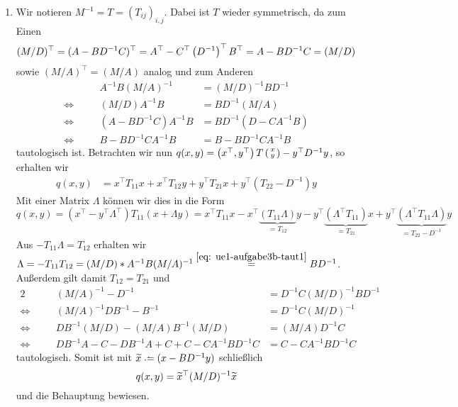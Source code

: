 \begin{exercisePage}
	\begin{enumerate}[label=(\alph*)]
		\item Wir notieren $M^{-1} = T = (T_{ij})_{i,j}$. Dabei ist $T$ wieder symmetrisch, da zum Einen
		\begin{equation*}
			(M/D)^\top
			= (A - BD^{-1}C)^\top 
			= A^\top - C^\top \left( D^{-1} \right)^{\top} B^\top
			= A - BD^{-1}C 
			= (M/D)
		\end{equation*}
		sowie $(M/A)^\top = (M/A)$ analog und zum Anderen
		\begin{equation}
			\begin{alignedat}{2}
				&& A^{-1} B(M/A)^{-1} &= (M/D)^{-1} BD^{-1} \\
				\Leftrightarrow &\quad& (M/D)A^{-1}B &= BD^{-1} (M/A) \\
				\Leftrightarrow &\quad& (A-BD^{-1}C)A^{-1}B  &= BD^{-1}(D-CA^{-1}B) \\
				\Leftrightarrow &\quad& B-BD^{-1}CA^{-1}B &= B-BD^{-1}CA^{-1}B 
			\end{alignedat}
			\tag{$\star$} \label{eq: ue1-aufgabe3b-taut1}
		\end{equation}
		tautologisch ist.
		Betrachten wir nun $q(x,y) = \left( x^\top, y^\top \right) T \left(\begin{smallmatrix} x \\ y \end{smallmatrix}\right) - y^\top D^{-1} y$, so erhalten wir
		\begin{align*}
			q(x,y) 
			&= x^\top T_{11} x + x^\top T_{12} y + y^\top T_{21} x + y^\top (T_{22} - D^{-1}) y
		\end{align*}
		Mit einer Matrix $\Lambda$ können wir dies in die Form
		\begin{equation*}
			q(x,y) 
			= (x^\top - y^\top \Lambda^\top) T_{11} (x + \Lambda y)
			= x^\top T_{11} x - x^\top \underbrace{(T_{11} \Lambda)}_{=T_{12}} y - y^\top \underbrace{(\Lambda^\top T_{11})}_{= T_{21}} x + y^\top \underbrace{(\Lambda^\top T_{11} \Lambda)}_{= T_{22} - D^{-1}} y
		\end{equation*}
		Aus $-T_{11} \Lambda = T_{12}$ erhalten wir $\Lambda = -T_{11} T_{12} = (M/D) * A^{-1} B (M/A)^{-1} \overset{{\eqref{eq: ue1-aufgabe3b-taut1}}}{=} BD^{-1}$. Außerdem gilt damit $T_{12} = T_{21}$ und
		\begin{alignat*}{2}
			&& (M/A)^{-1}-D^{-1} &= D^{-1} C(M/D)^{-1} BD^{-1} \\
			\Leftrightarrow &\quad& (M/A)^{-1} DB^{-1} - B^{-1} &= D^{-1} C(M/D)^{-1} \\
			\Leftrightarrow &\quad& DB^{-1} (M/D) -(M/A)B^{-1} (M/D) &= (M/A)D^{-1}C \\
			\Leftrightarrow &\quad& DB^{-1}A-C-DB^{-1}A+C+C-CA^{-1}BD^{-1}C &= C- CA^{-1}BD^{-1}C
		\end{alignat*}
		tautologisch. Somit ist mit $\schlange{x} \defeq (x - BD^{-1}y)$ schließlich 
		\begin{equation*}
			q(x,y) = \widetilde{x}^\top (M/D)^{-1} \widetilde{x}
		\end{equation*}
		und die Behauptung bewiesen.
		

\end{enumerate}
\end{exercisePage}

